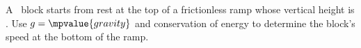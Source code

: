 A \, block starts from rest at the top of a frictionless ramp whose vertical
height is . Use $g=\mpvalue{gravity}$ and conservation of energy to determine
the block's speed at the bottom of the ramp.
